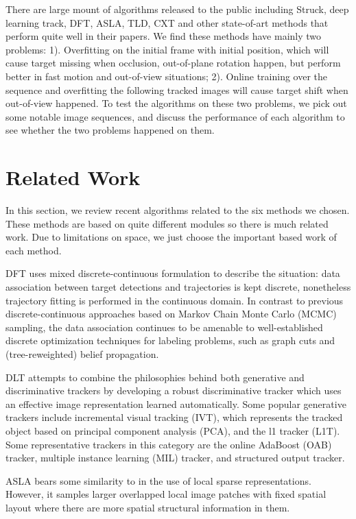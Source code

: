\documentclass{acm_proc_article-sp}
\begin{document}
There are large mount of algorithms released to the public including Struck\cite{struck}, deep learning track\cite{dlt}, DFT\cite{dcmt}, ASLA\cite{asla}, TLD\cite{tld}, CXT\cite{cxt} and other state-of-art methods that perform quite well in their papers. 
We find these methods have mainly two problems: 
1). Overfitting on the initial frame with initial position, which will cause target missing when occlusion, out-of-plane rotation happen, but perform better in fast motion and out-of-view situations;
2). Online training over the sequence and overfitting the following tracked images will cause target shift when out-of-view happened.
To test the algorithms on these two problems, we pick out some notable image sequences, and discuss the performance of each algorithm to see whether the two problems happened on them.

\section{Related Work}
In this section, we review recent algorithms related to the six methods we chosen.
These methods are based on quite different modules so there is much related work.
Due to limitations on space, we just choose the important based work of each method.

DFT uses mixed discrete-continuous formulation to describe the situation: data association between target detections and trajectories is kept discrete, nonetheless trajectory ﬁtting is performed in the continuous domain.
In contrast to previous discrete-continuous approaches based on Markov Chain Monte Carlo (MCMC) sampling\cite{rw4}\cite{rw5}, the data association continues to be amenable to well-established discrete optimization techniques for labeling problems, such as graph cuts\cite{rw2}\cite{rw3} and (tree-reweighted) belief propagation\cite{rw1}.

DLT attempts to combine the philosophies behind both generative and discriminative trackers by developing a robust discriminative tracker which uses an effective image representation learned automatically.
Some popular generative trackers include incremental visual tracking (IVT), which represents the tracked object based on principal component analysis (PCA), and the l1 tracker (L1T).
Some representative trackers in this category are the online AdaBoost (OAB) tracker, multiple instance learning (MIL) tracker, and structured output tracker.

ASLA bears some similarity to\cite{rw6} in the use of local sparse representations.
However, it samples larger overlapped local image patches with fixed spatial layout where there are more spatial structural information in them.
\end{document}
